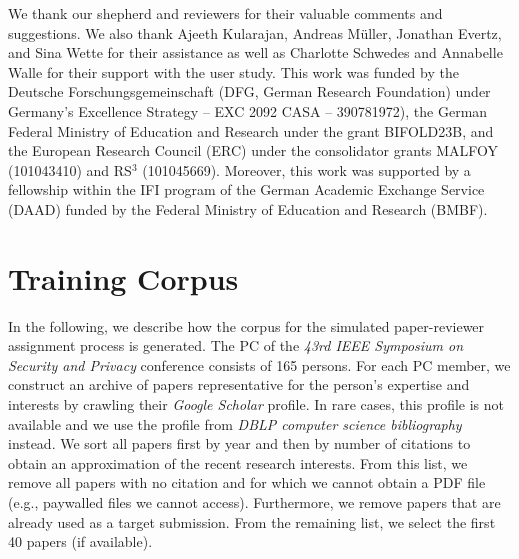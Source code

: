 \documentclass[letterpaper,twocolumn,10pt]{article}
\begin{document}
We thank our shepherd and reviewers for their valuable comments and suggestions. We also thank Ajeeth Kularajan, Andreas Müller, Jonathan Evertz, and {Sina\EndAccSupp{}} Wette for their assistance as well as Charlotte Schwedes and Annabelle {Walle\EndAccSupp{}} for their support with the user study. 
This work was funded by the {Deutsche\EndAccSupp{}} {Forschungsgemeinschaft\EndAccSupp{}} ({DFG\EndAccSupp{}}, German Research Foundation) under Germany's {Excellence\EndAccSupp{}} Strategy -- EXC 2092 CASA -- 390781972), the German Federal {Ministry\EndAccSupp{}} of Education and Research under the grant BIFOLD23B, and
the European Research {Council\EndAccSupp{}} (ERC) under the {consolidator\EndAccSupp{}} grants MALFOY (101043410) and RS$^3$ (101045669).
Moreover, this work was supported by a fellowship within the IFI program of the German Academic Exchange Service (DAAD) funded by the Federal {Ministry\EndAccSupp{}} of Education and Research (BMBF).
 



\let\oldthebibliography\thebibliography
\let\endoldthebibliography\endthebibliography
\renewenvironment{thebibliography}[1]{
  \begin{oldthebibliography}{#1}
    \setlength{\itemsep}{0.0em}
    \setlength{\parskip}{0.0em}
}
{
  \end{oldthebibliography}
}

{\footnotesize}

\appendix
\section{Training Corpus}
\label{app:corpus}
\vspace{-0.5em}

In the following, we describe how the corpus for the simulated paper-reviewer assignment process is generated. 
The PC of the \emph{43rd IEEE Symposium on Security and Privacy} conference consists of 165 persons. For each PC member, we construct an archive of papers representative for the person's expertise and interests by crawling their \emph{Google Scholar} profile. In rare cases, this profile is not available and we use the profile from \emph{DBLP computer science bibliography} instead. We sort all papers first by year and then by number of citations to obtain an approximation of the recent research interests. From this list, we remove all papers with no citation and for which we cannot obtain a PDF file (e.g., paywalled files we cannot access). Furthermore, we remove papers that are already used as a target submission. From the remaining list, we select the first 40 papers (if available). 
\end{document}

